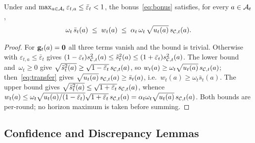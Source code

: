 \begin{lemma}\label{lem:bonus}
Under  and $\max_{a\in\mathcal{A}_t}\varepsilon_{t,a}\le\bar\varepsilon_t<1$,
the bonus~\eqref{eq:bonus} satisfies, for every $a\in\mathcal{A}_t$,
\begin{equation}\label{eq:bonus-sandwich}
  \omega_t\,\bar s_t(a)
  \;\le\;
  w_t(a)
  \;\le\;
  \alpha_t\,\omega_t\,\sqrt{u_t(a)}\,s_{\mathcal{C},t}(a).
\end{equation}
\end{lemma}
\begin{proof}
For $\mathbf{g}_t(a)=\mathbf0$ all three terms vanish and the bound is trivial.
Otherwise  with $\varepsilon_{t,a}\le\bar\varepsilon_t$ gives
$(1-\bar\varepsilon_t)s_{\mathcal{C},t}^2(a)\le\tilde s_t^2(a)\le
(1+\bar\varepsilon_t)s_{\mathcal{C},t}^2(a)$.  The lower bound and~$\omega_t\ge0$
give $\sqrt{\tilde s_t^2(a)}\ge\sqrt{1-\bar\varepsilon_t}\,s_{\mathcal{C},t}(a)$,
so $w_t(a)\ge\omega_t\sqrt{u_t(a)}\,s_{\mathcal{C},t}(a)$; then~\eqref{eq:transfer}
gives $\sqrt{u_t(a)}\,s_{\mathcal{C},t}(a)\ge\bar s_t(a)$, i.e.\
$w_t(a)\ge\omega_t\bar s_t(a)$.  The upper bound gives
$\sqrt{\tilde s_t^2(a)}\le\sqrt{1+\bar\varepsilon_t}\,s_{\mathcal{C},t}(a)$, whence
$w_t(a)\le\omega_t\sqrt{u_t(a)/(1-\bar\varepsilon_t)}\sqrt{1+\bar\varepsilon_t}\,
s_{\mathcal{C},t}(a)=\alpha_t\omega_t\sqrt{u_t(a)}\,s_{\mathcal{C},t}(a)$.
Both bounds are per-round; no horizon maximum is taken before summing.
\end{proof}



\subsection{Confidence and Discrepancy Lemmas}

